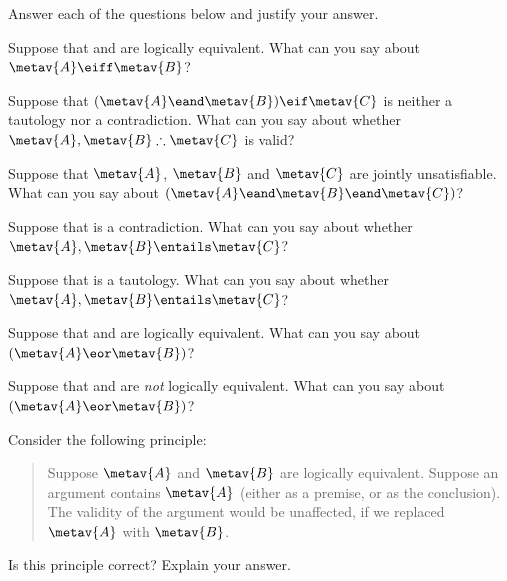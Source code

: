 \solutions
\problempart
\label{pr.TT.concepts}
Answer each of the questions below and justify your answer.
\begin{compactlist}
\item Suppose that  and  are logically equivalent. What can you say about $\metav{A}\eiff\metav{B}$?
\item Suppose that $(\metav{A}\eand\metav{B})\eif\metav{C}$ is neither a tautology nor a contradiction. What can you say about whether $\metav{A}, \metav{B} \therefore\metav{C}$ is valid?
\item Suppose that $\metav{A}$, $\metav{B}$ and $\metav{C}$  are jointly unsatisfiable. What can you say about $(\metav{A}\eand\metav{B}\eand\metav{C})$?
\item Suppose that  is a contradiction. What can you say about whether $\metav{A}, \metav{B} \entails \metav{C}$?
\item Suppose that  is a tautology. What can you say about whether $\metav{A}, \metav{B}\entails \metav{C}$?
\item Suppose that  and  are logically equivalent. What can you say about $(\metav{A}\eor\metav{B})$?
\item Suppose that  and  are \emph{not} logically equivalent. What can you say about $(\metav{A}\eor\metav{B})$?
\end{compactlist}
\problempart 
Consider the following principle:
	\begin{quote}
		Suppose $\metav{A}$ and $\metav{B}$ are logically equivalent. Suppose an argument contains $\metav{A}$ (either as a premise, or as the conclusion). The validity of the argument would be unaffected, if we replaced $\metav{A}$ with $\metav{B}$.
	\end{quote}
Is this principle correct? Explain your answer.

